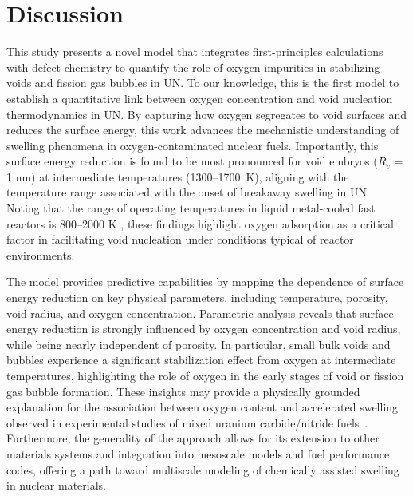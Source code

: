 \documentclass[preprint,12pt,sort&compress]{elsarticle}
\newcommand{\?}{\stackrel{?}{=}}
\begin{document}
\section{Discussion}

This study presents a novel model that integrates first-principles calculations with defect chemistry to quantify the role of oxygen impurities in stabilizing voids and fission gas bubbles in UN. To our knowledge, this is the first model to establish a quantitative link between oxygen concentration and void nucleation thermodynamics in UN. By capturing how oxygen segregates to void surfaces and reduces the surface energy, this work advances the mechanistic understanding of swelling phenomena in oxygen-contaminated nuclear fuels. Importantly, this surface energy reduction is found to be most pronounced for void embryos ($R_v$ = 1 nm) at intermediate temperatures (1300--1700~K), aligning with the temperature range associated with the onset of breakaway swelling in UN \cite{Ronchi1975,Ronchi1978,Rizk2025}. Noting that the range of operating temperatures in liquid metal-cooled fast reactors is 800--2000 K \cite{Turos1990}, these findings highlight oxygen adsorption as a critical factor in facilitating void nucleation under conditions typical of reactor environments.

The model provides predictive capabilities by mapping the dependence of surface energy reduction on key physical parameters, including temperature, porosity, void radius, and oxygen concentration. Parametric analysis reveals that surface energy reduction is strongly influenced by oxygen concentration and void radius, while being nearly independent of porosity. In particular, small bulk voids and bubbles experience a significant stabilization effect from oxygen at intermediate temperatures, highlighting the role of oxygen in the early stages of void or fission gas bubble formation. These insights may provide a physically grounded explanation for the association between oxygen content and accelerated swelling observed in experimental studies of mixed uranium carbide/nitride fuels~\cite{Rogozkin2003}. Furthermore, the generality of the approach allows for its extension to other materials systems and integration into mesoscale models and fuel performance codes, offering a path toward multiscale modeling of chemically assisted swelling in nuclear materials.
\end{document}
